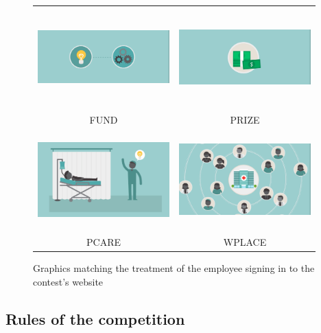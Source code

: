 \documentclass[12pt, titlepage]{article}
\begin{document}
\begin{figure}
\centering
\caption{Graphics matching the treatment of the employee signing in to the contest's website}
\label{app: graphics}
\begin{tabular}{cc}
\includegraphics[width=2in, height=1.5in]{Images/priming/funding.png} & 
\includegraphics[width=2in, height=1.5in]{Images/priming/money.png} \\
FUND & PRIZE \\
\includegraphics[width=2in, height=1.5in]{Images/priming/patientcare.png} & 
\includegraphics[width=2in, height=1.5in]{Images/priming/workplace.png} \\
PCARE & WPLACE
\end{tabular}
\end{figure}

\clearpage

\subsection{Rules of the competition}\label{rules-of-the-competition}
\end{document}
